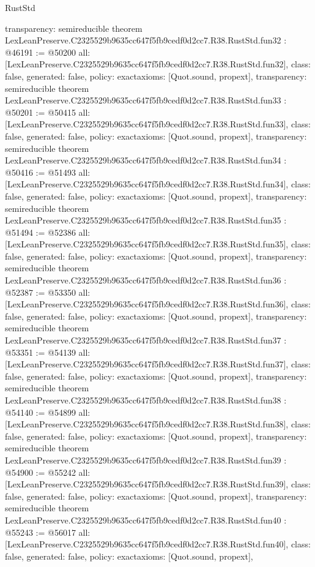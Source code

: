 \begin{lexlean}{RustStd}
\begin{coremodule}
{  transparency: semireducible
}
theorem LexLeanPreserve.C2325529b9635cc647f5fb9cedf0d2cc7.R38.RustStd.fun32 : @46191 := @50200 {
  all: [LexLeanPreserve.C2325529b9635cc647f5fb9cedf0d2cc7.R38.RustStd.fun32],
  class: false,
  generated: false,
  policy: exact{axioms: [Quot.sound, propext]},
  transparency: semireducible
}
theorem LexLeanPreserve.C2325529b9635cc647f5fb9cedf0d2cc7.R38.RustStd.fun33 : @50201 := @50415 {
  all: [LexLeanPreserve.C2325529b9635cc647f5fb9cedf0d2cc7.R38.RustStd.fun33],
  class: false,
  generated: false,
  policy: exact{axioms: [Quot.sound, propext]},
  transparency: semireducible
}
theorem LexLeanPreserve.C2325529b9635cc647f5fb9cedf0d2cc7.R38.RustStd.fun34 : @50416 := @51493 {
  all: [LexLeanPreserve.C2325529b9635cc647f5fb9cedf0d2cc7.R38.RustStd.fun34],
  class: false,
  generated: false,
  policy: exact{axioms: [Quot.sound, propext]},
  transparency: semireducible
}
theorem LexLeanPreserve.C2325529b9635cc647f5fb9cedf0d2cc7.R38.RustStd.fun35 : @51494 := @52386 {
  all: [LexLeanPreserve.C2325529b9635cc647f5fb9cedf0d2cc7.R38.RustStd.fun35],
  class: false,
  generated: false,
  policy: exact{axioms: [Quot.sound, propext]},
  transparency: semireducible
}
theorem LexLeanPreserve.C2325529b9635cc647f5fb9cedf0d2cc7.R38.RustStd.fun36 : @52387 := @53350 {
  all: [LexLeanPreserve.C2325529b9635cc647f5fb9cedf0d2cc7.R38.RustStd.fun36],
  class: false,
  generated: false,
  policy: exact{axioms: [Quot.sound, propext]},
  transparency: semireducible
}
theorem LexLeanPreserve.C2325529b9635cc647f5fb9cedf0d2cc7.R38.RustStd.fun37 : @53351 := @54139 {
  all: [LexLeanPreserve.C2325529b9635cc647f5fb9cedf0d2cc7.R38.RustStd.fun37],
  class: false,
  generated: false,
  policy: exact{axioms: [Quot.sound, propext]},
  transparency: semireducible
}
theorem LexLeanPreserve.C2325529b9635cc647f5fb9cedf0d2cc7.R38.RustStd.fun38 : @54140 := @54899 {
  all: [LexLeanPreserve.C2325529b9635cc647f5fb9cedf0d2cc7.R38.RustStd.fun38],
  class: false,
  generated: false,
  policy: exact{axioms: [Quot.sound, propext]},
  transparency: semireducible
}
theorem LexLeanPreserve.C2325529b9635cc647f5fb9cedf0d2cc7.R38.RustStd.fun39 : @54900 := @55242 {
  all: [LexLeanPreserve.C2325529b9635cc647f5fb9cedf0d2cc7.R38.RustStd.fun39],
  class: false,
  generated: false,
  policy: exact{axioms: [Quot.sound, propext]},
  transparency: semireducible
}
theorem LexLeanPreserve.C2325529b9635cc647f5fb9cedf0d2cc7.R38.RustStd.fun40 : @55243 := @56017 {
  all: [LexLeanPreserve.C2325529b9635cc647f5fb9cedf0d2cc7.R38.RustStd.fun40],
  class: false,
  generated: false,
  policy: exact{axioms: [Quot.sound, propext]},
}
\end{coremodule}
\end{lexlean}
